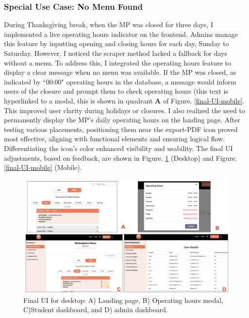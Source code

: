 \documentclass[10pt,twocolumn]{article}
\begin{document}
\subsubsection{Special Use Case: No Menu Found}
During Thanksgiving break, when the MP was closed for three days, I implemented a live operating hours indicator on the frontend. Admins manage this feature by inputting opening and closing hours for each day, Sunday to Saturday. However, I noticed the scraper method lacked a fallback for days without a menu. To address this, I integrated the operating hours feature to display a clear message when no menu was available. If the MP was closed, as indicated by ``00:00" operating hours in the database, a message would inform users of the closure and prompt them to check operating hours (this text is hyperlinked to a modal, this is shown in quadrant \textbf{A} of Figure. \ref{final-UI-mobile}. This improved user clarity during holidays or closures. I also realized the need to permanently display the MP’s daily operating hours on the landing page. After testing various placements, positioning them near the export-PDF icon proved most effective, aligning with functional elements and ensuring logical flow. Differentiating the icon's color enhanced visibility and usability. The final UI adjustments, based on feedback, are shown in Figure. \ref{final-UI-desktop} (Desktop) and Figure. \ref{final-UI-mobile} (Mobile).
    \begin{figure}
    \centering
    \includegraphics[width=1.0\linewidth]{images/final-UI-desktop.png} %
    \caption{
       Final UI for desktop: A) Landing page, B) Operating hours modal, C)Student dashboard, and D) admin dashboard.
    }\label{final-UI-desktop}
\end{figure}
\end{document}
